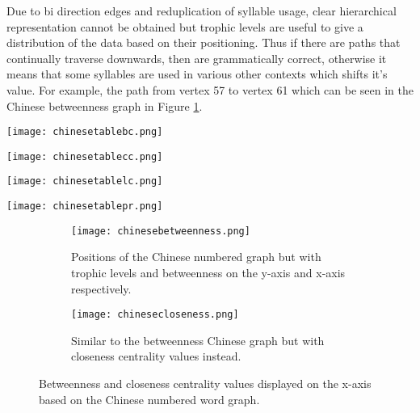 Due to bi direction edges and reduplication of syllable usage, clear hierarchical representation cannot be obtained but trophic levels are useful to give a distribution of the data based on their positioning. Thus if there are paths that continually traverse downwards, then are grammatically correct, otherwise it means that some syllables are used in various other contexts which shifts it's value. For example, the path from vertex 57 to vertex 61 which can be seen in the Chinese betweenness graph in Figure \ref{fig:cnbc}. 

\begin{table}[H]
\centering
\begin{subtable}{.2\textwidth}
	\centering
	\texttt{[image: chinesetablebc.png]}
	\caption{}
	\label{table:chinesetablebc}
\end{subtable}
\hfill
\begin{subtable}{.2\textwidth}
	\centering
	\texttt{[image: chinesetablecc.png]}
	\caption{}
	\label{table:chinesetablecc}
\end{subtable}
\hfill
\begin{subtable}{.2\textwidth}
	\centering
	\texttt{[image: chinesetablelc.png]}
	\caption{}
	\label{table:chinesetablelc}
\end{subtable}
\hfill
\begin{subtable}{.2\textwidth}
	\centering
	\texttt{[image: chinesetablepr.png]}
	\caption{}
	\label{table:chinesetablepr}
\end{subtable}
\caption{}
\end{table}

\begin{figure}[H]
\centering
\begin{subfigure}{.45\textwidth}
	\hspace{-1cm} 
	\texttt{[image: chinesebetweenness.png]}
	\caption{Positions of the Chinese numbered graph but with trophic levels and betweenness on the y-axis and x-axis respectively.}
	\label{fig:cnbc}
\end{subfigure}
\hfill
\begin{subfigure}{.45\textwidth}
	\hspace{-1cm} 
	\texttt{[image: chinesecloseness.png]}
	\caption{Similar to the betweenness Chinese graph but with closeness centrality values instead. }
	\label{fig:cncc}
\end{subfigure}
\caption{Betweenness and closeness centrality values displayed on the x-axis based on the Chinese numbered word graph.}
\label{fig:cncentrality}
\end{figure}

